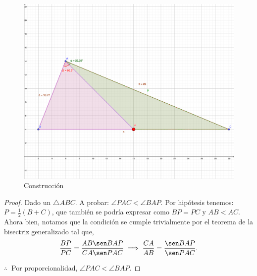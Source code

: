 	\begin{figure}[H]
	\centering
	\includegraphics[scale=0.5]{Images/P5.png}
	\caption{Construcción}
\end{figure}

\begin{proof}
	Dado un $\triangle ABC$. A probar: $\angle PAC< \angle BAP$. Por hipótesis tenemos: $P=\frac{1}{2}(B+C)$, que también se podría expresar como $BP=PC$ y $AB<AC$. Ahora bien, notamos que la condición se cumple trivialmente por el teorema de la bisectriz generalizado tal que, 
	$$\frac{BP}{PC}=\frac{AB\sen BAP}{CA\sen PAC}\implies \frac{CA}{AB}=\frac{\sen BAP}{\sen PAC}.$$
	
	$\therefore \ $ Por proporcionalidad, $\angle PAC< \angle BAP$.
	
\end{proof}



















